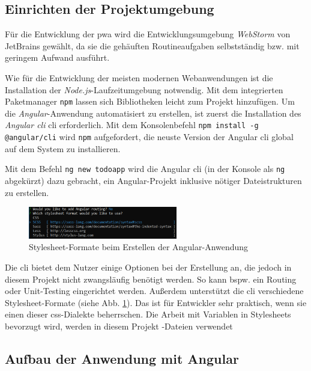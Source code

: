 \subsection{Einrichten der Projektumgebung}
Für die Entwicklung der \ac{pwa} wird die Entwicklungsumgebung \textit{WebStorm} von JetBrains gewählt, da sie die gehäuften Routineaufgaben selbstständig bzw. mit geringem Aufwand ausführt.

Wie für die Entwicklung der meisten modernen Webanwendungen ist die Installation der \textit{Node.js}-Laufzeitumgebung notwendig. Mit dem integrierten Paketmanager \texttt{npm} lassen sich Bibliotheken leicht zum Projekt hinzufügen.
Um die \textit{Angular}-Anwendung automatisiert zu erstellen, ist zuerst die Installation des \textit{Angular \acl{cli}} \acs{cli} erforderlich. Mit dem Konsolenbefehl \texttt{npm install -g @angular/cli} wird \texttt{npm} aufgefordert, die neuste Version der Angular \ac{cli} global auf dem System zu installieren.

Mit dem Befehl \texttt{ng new todoapp} wird die Angular \ac{cli} (in der Konsole als \texttt{ng} abgekürzt) dazu gebracht, ein Angular-Projekt inklusive nötiger Dateistrukturen zu erstellen.

\begin{figure}[h!]
	\centering
	\includegraphics[width=0.58\textwidth]{img/angular_cli_css.PNG}
	\caption{Stylesheet-Formate beim Erstellen der Angular-Anwendung}
	\label{fig:stylesheet_formate_cli}
\end{figure}

Die \ac{cli} bietet dem Nutzer einige Optionen bei der Erstellung an, die jedoch in diesem Projekt nicht zwangsläufig benötigt werden. So kann bspw. ein Routing oder Unit-Testing eingerichtet werden.
Außerdem unterstützt die \ac{cli} verschiedene Stylesheet-Formate (siehe Abb. \ref{fig:stylesheet_formate_cli}). Das ist für Entwickler sehr praktisch, wenn sie einen dieser \ac{css}-Dialekte beherrschen. Die Arbeit mit Variablen in Stylesheets bevorzugt wird, werden in diesem Projekt -Dateien verwendet

\subsection{Aufbau der Anwendung mit Angular}

